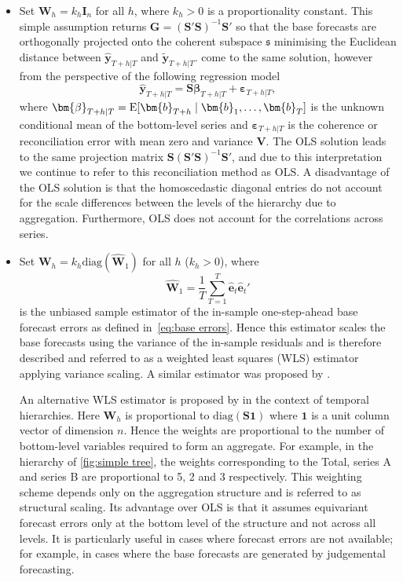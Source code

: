 {\begin{itemize}\parskip=1.2ex
	\item Set $\bm{W}_{h}=k_h\bm{I}_n$ for all $h$, where $k_{h} > 0$ is a proportionality constant. This simple assumption returns $\bm{G}=(\bm{S}'\bm{S})^{-1}\bm{S}'$ so that the base forecasts are orthogonally projected onto the coherent subspace $\mathfrak{s}$ minimising the Euclidean distance between $\hat{\bm{y}}_{T+h|T}$ and $\tilde{\bm{y}}_{T+h|T}$. \citet{HynEtAl2011} come to the same solution, however from the perspective of the following regression model
  \begin{equation*}
    \hat{\bm{y}}_{T+h|T} = \bm{S}\bm{\beta}_{T+h|T} + \bm{\varepsilon}_{T+h|T},
  \end{equation*}
  where $\bm{\beta}_{T+h|T}=\E[\bm{b}_{T+h}\mid\bm{b}_1,\dots,\bm{b}_T]$ is the unknown conditional mean of the bottom-level series and $\bm{\varepsilon}_{T+h|T}$ is the coherence or reconciliation error with mean zero and variance $\bm{V}$. The OLS solution leads to the same projection matrix $\bm{S}(\bm{S}'\bm{S})^{-1}\bm{S}'$, and due to this interpretation we continue to refer to this reconciliation method as OLS\@. A disadvantage of the OLS solution is that the homoscedastic diagonal entries do not account for the scale differences between the levels of the hierarchy due to aggregation. Furthermore, OLS does not account for the correlations across series.

	\item Set ${\bm{W}}_{h}=k_{h}\text{diag}(\hat{\bm{W}}_{1})$ for all $h$ ($k_{h} > 0$), where
  $$
    \hat{\bm{W}}_{1} = \frac{1}{T}\sum_{T=1}^{T} \hat{\bm{e}}_{t}\hat{\bm{e}}_{t}'
  $$
  is the unbiased sample estimator of the in-sample one-step-ahead base forecast errors as defined in~\eqref{eq:base errors}. Hence this estimator scales the base forecasts using the variance of the in-sample residuals and is therefore described and referred to as a weighted least squares (WLS) estimator applying variance scaling. A similar estimator was proposed by \citet{Hyndman2016}.

  An alternative WLS estimator is proposed by \citet{AthEtAl2017} in the context of temporal hierarchies. Here $\bm{W}_{h}$ is proportional to $\text{diag}(\bm{S}\bm{1})$ where $\bm{1}$ is a unit column vector of dimension $n$. Hence the weights are proportional to the number of bottom-level variables required to form an aggregate. For example, in the hierarchy of \ref{fig:simple tree}, the weights corresponding to the Total, series A and series B are proportional to 5, 2 and 3 respectively. This weighting scheme depends only on the aggregation structure and is referred to as structural scaling. Its advantage over OLS is that it assumes equivariant forecast errors only at the bottom level of the structure and not across all levels. It is particularly useful in cases where forecast errors are not available; for example, in cases where the base forecasts are generated by judgemental forecasting.


\end{itemize}}
